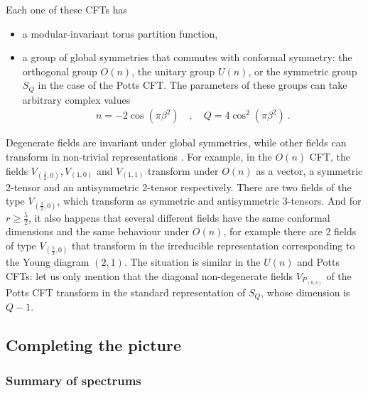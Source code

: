 \documentclass[12pt, a4paper]{article}
\theoremstyle{break}
\begin{document}
Each one of these CFTs has
\begin{itemize}
 \item a modular-invariant torus partition function,
 \item a group of global symmetries that commutes with conformal symmetry: the orthogonal group $O(n)$, the unitary group $U(n)$, or the symmetric group $S_Q$ in the case of the Potts CFT. The parameters of these groups can take arbitrary complex values \cite{gnjrs21, br19}
 \begin{align}
  \boxed{n = -2\cos\left(\pi \beta^2\right)} \quad , \quad \boxed{Q = 4\cos^2\left(\pi \beta^2\right)}\ .
  \label{nQ}
 \end{align}
\end{itemize}
Degenerate fields are invariant under global symmetries, while other fields can transform in non-trivial representations \cite{jrs22, rjrs24}. For example, in the $O(n)$ CFT, the fields $V_{(\frac12,0)},V_{(1,0)}$ and $V_{(1,1)}$ transform under $O(n)$ as a vector, a symmetric 2-tensor and an antisymmetric 2-tensor respectively. There are two fields of the type $V_{(\frac32,0)}$, which transform as symmetric and antisymmetric 3-tensors. And for $r\geq \frac52$, it also happens that several different fields have the same conformal dimensions and the same behaviour under $O(n)$, for example there are 2 fields of type $V_{(\frac52,0)}$ that transform in the irreducible representation corresponding to the Young diagram $(2,1)$. The situation is similar in the $U(n)$ and Potts CFTs: let us only mention that the diagonal non-degenerate fields $V_{P_{(0,s)}}$ of the Potts CFT transform in the standard  representation of $S_Q$, whose dimension is $Q-1$. 


\subsection{Completing the picture}

\subsubsection{Summary of spectrums}
\end{document}
